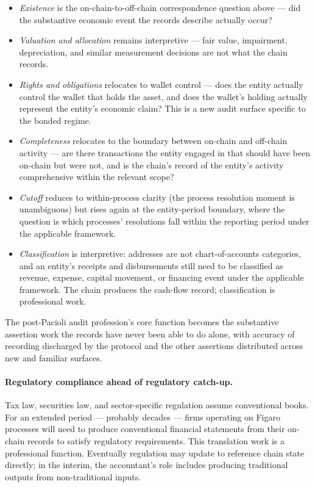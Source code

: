 \documentclass[11pt,a4paper]{article}
\theoremstyle{definition}
\theoremstyle{remark}
\begin{document}
\begin{itemize}
  \item \emph{Existence} is the on-chain-to-off-chain
    correspondence question above --- did the substantive
    economic event the records describe actually occur?
  \item \emph{Valuation and allocation} remains interpretive ---
    fair value, impairment, depreciation, and similar
    measurement decisions are not what the chain records.
  \item \emph{Rights and obligations} relocates to wallet
    control --- does the entity actually control the wallet
    that holds the asset, and does the wallet's holding
    actually represent the entity's economic claim? This is
    a new audit surface specific to the bonded regime.
  \item \emph{Completeness} relocates to the boundary between
    on-chain and off-chain activity --- are there transactions
    the entity engaged in that should have been on-chain but
    were not, and is the chain's record of the entity's
    activity comprehensive within the relevant scope?
  \item \emph{Cutoff} reduces to within-process clarity (the
    process resolution moment is unambiguous) but rises again
    at the entity-period boundary, where the question is which
    processes' resolutions fall within the reporting period
    under the applicable framework.
  \item \emph{Classification} is interpretive: addresses are
    not chart-of-accounts categories, and an entity's
    receipts and disbursements still need to be classified as
    revenue, expense, capital movement, or financing event
    under the applicable framework. The chain produces the
    cash-flow record; classification is professional work.
\end{itemize}

The post-Pacioli audit profession's core function becomes the
substantive assertion work the records have never been able to
do alone, with accuracy of recording discharged by the
protocol and the other assertions distributed across new and
familiar surfaces.

\paragraph{Regulatory compliance ahead of regulatory catch-up.}
Tax law, securities law, and sector-specific regulation
assume conventional books. For an extended period ---
probably decades --- firms operating on Figaro processes
will need to produce conventional financial statements from
their on-chain records to satisfy regulatory requirements.
This translation work is a professional function. Eventually
regulation may update to reference chain state directly; in
the interim, the accountant's role includes producing
traditional outputs from non-traditional inputs.
\end{document}
